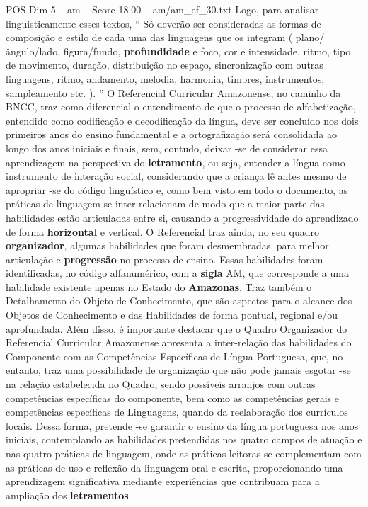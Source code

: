 \begin{textsample}{POS Dim 5 – am – Score 18.00 – am/am\_ef\_30.txt}
Logo, para analisar linguisticamente esses textos, “ Só deverão ser consideradas as formas de composição e estilo de cada uma das linguagens que os integram ( plano/ângulo/lado, figura/fundo, \textbf{profundidade} e foco, cor e intensidade, ritmo, tipo de movimento, duração, distribuição no espaço, sincronização com outras linguagens, ritmo, andamento, melodia, harmonia, timbres, instrumentos, sampleamento etc. ). ” O Referencial Curricular Amazonense, no caminho da BNCC, traz como diferencial o entendimento de que o processo de alfabetização, entendido como codificação e decodificação da língua, deve ser concluído nos dois primeiros anos do ensino fundamental e a ortografização será consolidada ao longo dos anos iniciais e finais, sem, contudo, deixar -se de considerar essa aprendizagem na perspectiva do \textbf{letramento}, ou seja, entender a língua como instrumento de interação social, considerando que a criança lê antes mesmo de apropriar -se do código linguístico e, como bem visto em todo o documento, as práticas de linguagem se inter-relacionam de modo que a maior parte das habilidades estão articuladas entre si, causando a progressividade do aprendizado de forma \textbf{horizontal} e vertical.
O Referencial traz ainda, no seu quadro \textbf{organizador}, algumas habilidades que foram desmembradas, para melhor articulação e \textbf{progressão} no processo de ensino.
Essas habilidades foram identificadas, no código alfanumérico, com a \textbf{sigla} AM, que corresponde a uma habilidade existente apenas no Estado do \textbf{Amazonas}.
Traz também o Detalhamento do Objeto de Conhecimento, que são aspectos para o alcance dos Objetos de Conhecimento e das Habilidades de forma pontual, regional e/ou aprofundada.
Além disso, é importante destacar que o Quadro Organizador do Referencial Curricular Amazonense apresenta a inter-relação das habilidades do Componente com as Competências Específicas de Língua Portuguesa, que, no entanto, traz uma possibilidade de organização que não pode jamais esgotar -se na relação estabelecida no Quadro, sendo possíveis arranjos com outras competências específicas do componente, bem como as competências gerais e competências específicas de Linguagens, quando da reelaboração dos currículos locais.
Dessa forma, pretende -se garantir o ensino da língua portuguesa nos anos iniciais, contemplando as habilidades pretendidas nos quatro campos de atuação e nas quatro práticas de linguagem, onde as práticas leitoras se complementam com as práticas de uso e reflexão da linguagem oral e escrita, proporcionando uma aprendizagem significativa mediante experiências que contribuam para a ampliação dos \textbf{letramentos}.

\end{textsample}
